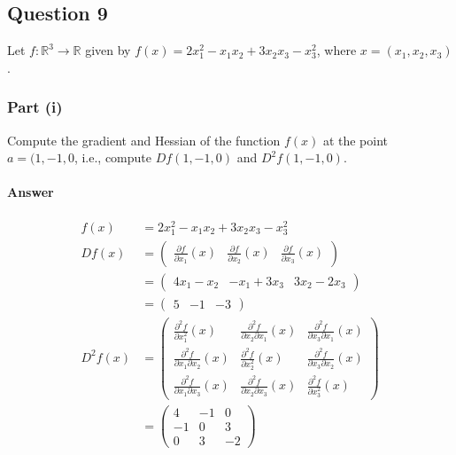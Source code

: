 \subsection{Question 9}
Let $ f : \mathbb{R}^3 \rightarrow \mathbb{R} $ given by $ f(x) = 2 x_1^2 -
    x_1 x_2 + 3 x_2 x_3 - x_3^2 $, where $ x = (x_1, x_2, x_3) $.

\subsubsection{Part (i)}
Compute the gradient and Hessian of the function $ f(x) $ at the point
    $ a = (1, -1, 0 $, i.e., compute $ D f(1, -1, 0) $ and $ D^2 f(1, -1, 0) $.

\paragraph{Answer}
\begin{align*}
    f(x) &= 2 x_1^2 - x_1 x_2 + 3 x_2 x_3 - x_3^2 \\
    D f(x)
        &=
        \begin{pmatrix}
            \frac{\partial f}{\partial x_1} (x) &
            \frac{\partial f}{\partial x_2} (x) &
            \frac{\partial f}{\partial x_3} (x)
        \end{pmatrix} \\
        &=
        \begin{pmatrix}
            4 x_1 - x_2 & -x_1 + 3 x_3 & 3 x_2 - 2 x_3
        \end{pmatrix} \\
        &=
        \begin{pmatrix}
            5 & -1 & -3
        \end{pmatrix} \\
    D^2 f(x)
        &=
        \begin{pmatrix}
            \frac{\partial^2 f}{\partial x_1^2} (x) &
            \frac{\partial^2 f}{\partial x_2 \partial x_1} (x) &
            \frac{\partial^2 f}{\partial x_3 \partial x_1} (x) \\
            \frac{\partial^2 f}{\partial x_1 \partial x_2} (x) &
            \frac{\partial^2 f}{\partial x_2^2} (x) &
            \frac{\partial^2 f}{\partial x_3 \partial x_2} (x) \\
            \frac{\partial^2 f}{\partial x_1 \partial x_3} (x) &
            \frac{\partial^2 f}{\partial x_2 \partial x_3} (x) &
            \frac{\partial^2 f}{\partial x_3^2} (x)
        \end{pmatrix} \\
        &=
        \begin{pmatrix}
            4 & -1 & 0 \\
            -1 & 0 & 3 \\
            0 & 3 & -2
        \end{pmatrix}
\end{align*}


